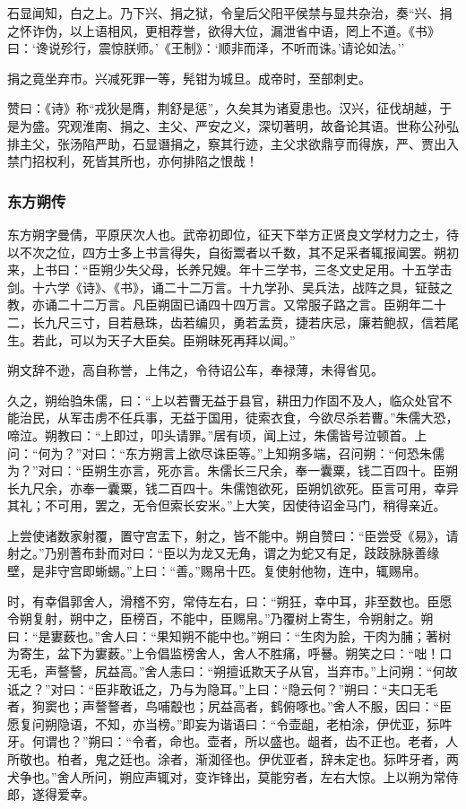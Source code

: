 \documentclass[]{article}
\begin{document}
石显闻知，白之上。乃下兴、捐之狱，令皇后父阳平侯禁与显共杂治，奏``兴、捐之怀诈伪，以上语相风，更相荐誉，欲得大位，漏泄省中语，罔上不道。《书》曰：`谗说殄行，震惊朕师。'《王制》：`顺非而泽，不听而诛。'请论如法。''

捐之竟坐弃市。兴减死罪一等，髡钳为城旦。成帝时，至部刺史。

赞曰：《诗》称``戎狄是膺，荆舒是惩''，久矣其为诸夏患也。汉兴，征伐胡越，于是为盛。究观淮南、捐之、主父、严安之义，深切著明，故备论其语。世称公孙弘排主父，张汤陷严助，石显谮捐之，察其行迹，主父求欲鼎亨而得族，严、贾出入禁门招权利，死皆其所也，亦何排陷之恨哉！

\hypertarget{header-n4919}{%
\subsubsection{东方朔传}\label{header-n4919}}

东方朔字曼倩，平原厌次人也。武帝初即位，征天下举方正贤良文学材力之士，待以不次之位，四方士多上书言得失，自衒鬻者以千数，其不足采者辄报闻罢。朔初来，上书曰：``臣朔少失父母，长养兄嫂。年十三学书，三冬文史足用。十五学击剑。十六学《诗》、《书》，诵二十二万言。十九学孙、吴兵法，战阵之具，钲鼓之教，亦诵二十二万言。凡臣朔固已诵四十四万言。又常服子路之言。臣朔年二十二，长九尺三寸，目若悬珠，齿若编贝，勇若孟贲，捷若庆忌，廉若鲍叔，信若尾生。若此，可以为天子大臣矣。臣朔昧死再拜以闻。''

朔文辞不逊，高自称誉，上伟之，令待诏公车，奉禄薄，未得省见。

久之，朔绐驺朱儒，曰：``上以若曹无益于县官，耕田力作固不及人，临众处官不能治民，从军击虏不任兵事，无益于国用，徒索衣食，今欲尽杀若曹。''朱儒大恐，啼泣。朔教曰：``上即过，叩头请罪。''居有顷，闻上过，朱儒皆号泣顿首。上问：``何为？''对曰：``东方朔言上欲尽诛臣等。''上知朔多端，召问朔：``何恐朱儒为？''对曰：``臣朔生亦言，死亦言。朱儒长三尺余，奉一囊粟，钱二百四十。臣朔长九尺余，亦奉一囊粟，钱二百四十。朱儒饱欲死，臣朔饥欲死。臣言可用，幸异其礼；不可用，罢之，无令但索长安米。''上大笑，因使待诏金马门，稍得亲近。

上尝使诸数家射覆，置守宫盂下，射之，皆不能中。朔自赞曰：``臣尝受《易》，请射之。''乃别蓍布卦而对曰：``臣以为龙又无角，谓之为蛇又有足，跂跂脉脉善缘壁，是非守宫即蜥蜴。''上曰：``善。''赐帛十匹。复使射他物，连中，辄赐帛。

时，有幸倡郭舍人，滑稽不穷，常侍左右，曰：``朔狂，幸中耳，非至数也。臣愿令朔复射，朔中之，臣榜百，不能中，臣赐帛。''乃覆树上寄生，令朔射之。朔曰：``是寠薮也。''舍人曰：``果知朔不能中也。''朔曰：``生肉为脍，干肉为脯；著树为寄生，盆下为寠薮。''上令倡监榜舍人，舍人不胜痛，呼謈。朔笑之曰：``咄！口无毛，声謷謷，尻益高。''舍人恚曰：``朔擅诋欺天子从官，当弃市。''上问朔：``何故诋之？''对曰：``臣非敢诋之，乃与为隐耳。''上曰：``隐云何？''朔曰：``夫口无毛者，狗窦也；声謷謷者，鸟哺鷇也；尻益高者，鹤俯啄也。''舍人不服，因曰：``臣愿复问朔隐语，不知，亦当榜。''即妄为谐语曰：``令壶龃，老柏涂，伊优亚，狋吽牙。何谓也？''朔曰：``令者，命也。壶者，所以盛也。龃者，齿不正也。老者，人所敬也。柏者，鬼之廷也。涂者，渐洳径也。伊优亚者，辞未定也。狋吽牙者，两犬争也。''舍人所问，朔应声辄对，变诈锋出，莫能穷者，左右大惊。上以朔为常侍郎，遂得爱幸。
\end{document}
